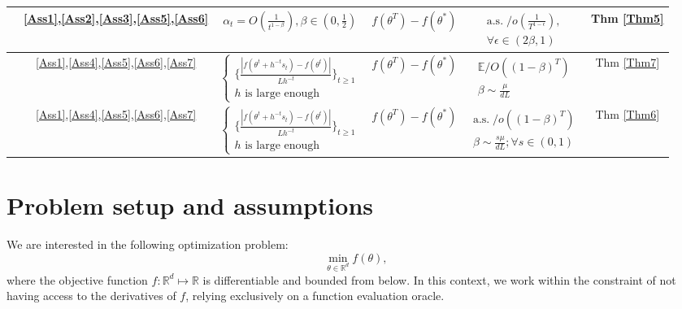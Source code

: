 \documentclass{article} %
\begin{document}
\begin{table}[h!]
\begin{tabular}{cccccc}
& \ref{Ass1},\ref{Ass2},\ref{Ass3},\ref{Ass5},\ref{Ass6} & 
$\alpha_t= O\left(\frac{1}{t^{1-\beta}} \right), \beta \in (0,\frac{1}{2})$ &
$f(\theta^T)-f(\theta^*)$  &
$\begin{array}{l}
\text{a.s.}\; / o\left(\frac{1}{T^{1- \epsilon }}\right), \\
\forall \epsilon \in (2 \beta,1)
\end{array}$ & Thm \ref{Thm5} \\
\hline

 & 
\ref{Ass1},\ref{Ass4},\ref{Ass5},\ref{Ass6},\ref{Ass7} &
$\begin{cases}
\{ \frac{|f(\theta^{t} + h^{-t} s_t) - f(\theta^t)|}{Lh^{-t}} \}_{t \ge 1}\\
h \text{ is large enough}
\end{cases}$ &
$ f(\theta^T)-f(\theta^*)$ &
$\begin{array}{l}
\mathbb{E}/O( (1- \beta)^T ) \\
 \beta\sim \frac{\mu}{dL}
\end{array}$

 & Thm \ref{Thm7} \\

& \ref{Ass1},\ref{Ass4},\ref{Ass5},\ref{Ass6},\ref{Ass7} & 
$\begin{cases}
\{ \frac{|f(\theta^{t} + h^{-t} s_t) - f(\theta^t)|}{Lh^{-t}} \}_{t \ge 1}\\
h \text{ is large enough}
\end{cases}$ &
$ f(\theta^T)-f(\theta^*)$ & 
$\begin{array}{l}
\text{a.s.}\; / o((1- \beta)^T) \\
 \beta\sim \frac{s \mu}{dL}; \forall s \in (0,1)
\end{array}$
& Thm \ref{Thm6} \\
\hline
\end{tabular}
\label{Table1}
\end{table}
\section{Problem setup and assumptions}\label{sec2}
We are interested in the following optimization problem:
$$\min_{\theta \in \mathbb{R}^d} f(\theta),$$
where the objective function $f : \mathbb{R}^d \mapsto \mathbb{R} $ is differentiable and bounded from below. In this context,
we work within the constraint of not having access to the derivatives of 
$f$, relying exclusively on a function evaluation oracle. 
\end{document}

